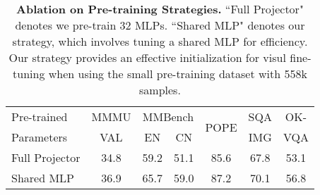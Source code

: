 \begin{table}[t]
  \centering
    \resizebox{\linewidth}{!}
    {
    \begin{tabular}{l|cccccc}
    \toprule
    Pre-trained &  MMMU & \multicolumn{2}{c}{MMBench} & \multirow{2}[2]{*}{POPE}  & SQA & OK-  \\
      Parameters  & VAL      &  EN & CN &           & IMG & VQA \\
    \midrule
    Full Projector & 34.8 & 59.2 & 51.1   & 85.6  & 67.8 & 53.1 \\
    \rowcolor{cyan!20} Shared MLP & 36.9 & 65.7 & 59.0 & 87.2  & 70.1 & 56.8  \\
    \bottomrule
    \end{tabular}
    }
    \caption{\textbf{Ablation on Pre-training Strategies.} 
    ``Full Projector" denotes we pre-train 32 MLPs.
    ``Shared MLP" denotes our strategy, which involves tuning a shared MLP for efficiency.
    Our strategy provides an effective initialization for visul fine-tuning when using the small pre-training dataset with 558k samples.
    }
  \label{tab:ablation_train}
\end{table}
